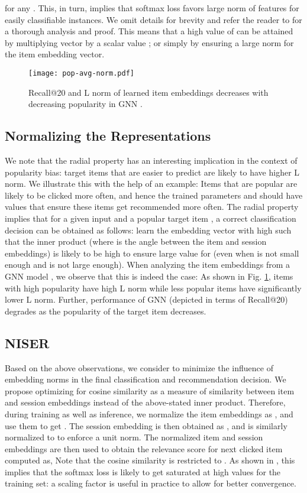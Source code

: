 \documentclass[sigconf]{acmart}
\begin{document}
for any .
This, in turn, implies that softmax loss favors large norm of features for easily classifiable instances.
We omit details for brevity and refer the reader to \cite{wang2017normface,zheng2018ring} for a thorough analysis and proof.
This means that a high value of  can be attained by multiplying vector  by a scalar value ; or simply by ensuring a large norm for the item embedding vector.
\begin{figure}[h]
	\centering
	\texttt{[image: pop-avg-norm.pdf]}
	\vspace{-2mm}
	\caption{Recall@20 and L norm of learned item embeddings decreases with decreasing popularity in GNN \cite{wu2018session}.\label{fig:pop}}
	\vspace{-4mm}
\end{figure}
\subsection{Normalizing the Representations \label{ssec:motiv}}
We note that the radial property has an interesting implication in the context of popularity bias: target items that are easier to predict are likely to have higher L norm. 
We illustrate this with the help of an example: Items that are popular are likely to be clicked more often, and hence the trained parameters  and  should have values that ensure these items get recommended more often.
The radial property implies that for a given input  and a popular target item , a correct classification decision can be obtained as follows: learn the embedding vector  with high  such that the inner product  (where  is the angle between the item and session embeddings) is likely to be high to ensure large value for  (even when  is not small enough and  is not large enough). 
When analyzing the item embeddings from a GNN model \cite{wu2018session}, we observe that this is indeed the case: As shown in Fig. \ref{fig:pop}, items with high popularity have high L norm while less popular items have significantly lower L norm. 
Further, performance of GNN (depicted in terms of Recall@20) degrades as the popularity of the target item decreases.

	     
\subsection{NISER}
Based on the above observations, we consider to minimize the influence of embedding norms in the final classification and recommendation decision. We propose optimizing for cosine similarity as a measure of similarity between item and session embeddings instead of the above-stated inner product. 
Therefore, during training as well as inference, we normalize the item embeddings as 
, 
and use them to get .
The session embedding is then obtained as 
, and is similarly normalized to   to enforce a unit norm.
The normalized item and session embeddings are then used to obtain the relevance score for next clicked item  computed as, 
Note that the cosine similarity  is restricted to . As shown in \cite{wang2017normface}, this implies that the softmax loss is likely to get saturated at high values for the training set: a scaling factor  is useful in practice to allow for better convergence.
\end{document}
